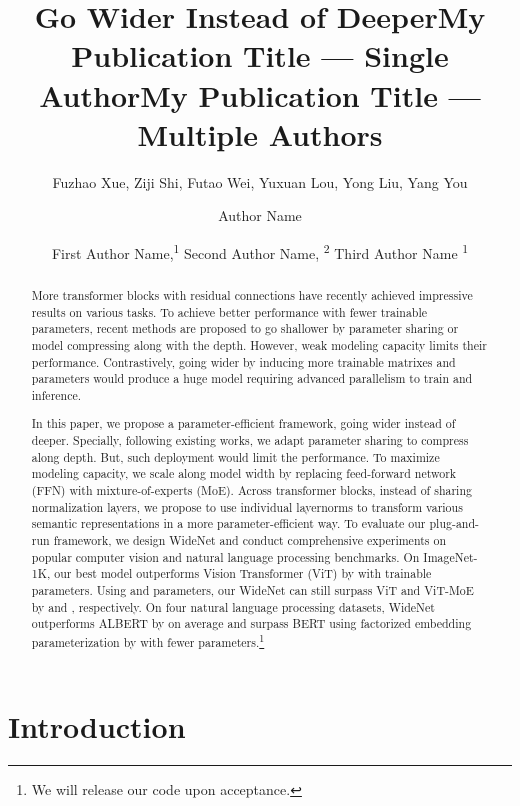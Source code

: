 \documentclass[letterpaper]{article} \usepackage{aaai22}  \usepackage{times}  \usepackage{helvet}  \usepackage{courier}  \usepackage[hyphens]{url}  \usepackage{graphicx} \urlstyle{rm} \def\UrlFont{\rm}  \usepackage{natbib}  \usepackage{caption} \DeclareCaptionStyle{ruled}{labelfont=normalfont,labelsep=colon,strut=off} \frenchspacing  \setlength{\pdfpagewidth}{8.5in}  \setlength{\pdfpageheight}{11in}  \usepackage{algorithm}
\title{Go Wider Instead of Deeper}
\author{
    Fuzhao Xue, 
        Ziji Shi,
        Futao Wei,
        Yuxuan Lou, 
        Yong Liu, 
        Yang You \\
}
\title{My Publication Title --- Single Author}
\author {
    Author Name
}
\title{My Publication Title --- Multiple Authors}
\author {
First Author Name,\textsuperscript{\rm 1}
    Second Author Name, \textsuperscript{\rm 2}
    Third Author Name \textsuperscript{\rm 1}
}
\begin{document}
\maketitle

\begin{abstract}
More transformer blocks with residual connections have recently achieved impressive results on various tasks. To achieve better performance with fewer trainable parameters, recent methods are proposed to go shallower by parameter sharing or model compressing along with the depth. However, weak modeling capacity limits their performance. Contrastively, going wider by inducing more trainable matrixes and parameters would produce a huge model requiring advanced parallelism to train and inference.  


In this paper, we propose a parameter-efficient framework, going wider instead of deeper. Specially, following existing works, we adapt parameter sharing to compress along depth. But, such deployment would limit the performance. To maximize modeling capacity, we scale along model width by replacing feed-forward network (FFN) with mixture-of-experts (MoE). Across transformer blocks, instead of sharing normalization layers, we propose to use individual layernorms to transform various semantic representations in a more parameter-efficient way. To evaluate our plug-and-run framework, we design WideNet and conduct comprehensive experiments on popular computer vision and natural language processing benchmarks. On ImageNet-1K, our best model outperforms Vision Transformer (ViT) by  with  trainable parameters. Using  and   parameters, our WideNet can still surpass ViT and ViT-MoE by  and , respectively. On four natural language processing datasets, WideNet outperforms ALBERT by  on average and surpass BERT using factorized embedding parameterization by  with fewer parameters.\footnote{We will release our code upon acceptance.}

\end{abstract}

\section{Introduction}
\label{sec:intro}
\end{document}
